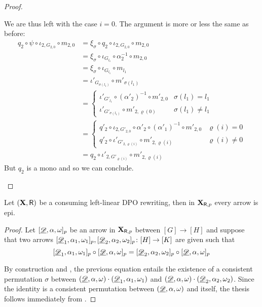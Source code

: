 \begin{proof}
\begin{enumerate}
	 We are thus left with the case $i=0$. The argument is more or less the same as before:
	 \begin{align*}
	 	q_2\circ \psi \circ \iota_{2, G_{2,0}}\circ m_{2,0}&=\xi_\sigma \circ q_2\circ \iota_{2, G_{2,0}}\circ m_{2,0}\\&=\xi_\sigma \circ \iota_{G_{l_1}}\circ \alpha^{-1}_2\circ m_{2,0}\\&=\xi_\sigma \circ \iota_{ G_{l_1}}\circ m_{l_1}\\&=\iota'_{G_{\sigma(l_1)}}\circ m'_{\sigma(l_1)}\\&=\begin{cases}
	 		\iota'_{G'_{l_1}}\circ (\alpha'_2)^{-1} \circ m'_{2, 0}  &\sigma(l_1) = l_1\\
	 		\iota'_{G'_{\sigma(l_1)}}\circ m'_{2,\varrho(0)} & \sigma(l_1)\neq l_1
	 	\end{cases}
	 	\\&=\begin{cases}
	 		q'_2\circ \iota_{2, G'_{2,0}} \circ \alpha'_2\circ  (\alpha'_1)^{-1} \circ m'_{2, 0}& \varrho(i)=0\\
	 		q'_2\circ \iota'_{G'_{2, \varrho(i)}} \circ m'_{2,\varrho(i)} & \varrho(i)\neq 0
	 	\end{cases}\\&=q_2\circ \iota'_{2, G'_{\varrho(i)}}\circ m'_{2, \varrho(i)}
	 \end{align*}
	 But $q_2$ is a mono and so we can conclude.	  \qedhere 
	\end{enumerate}
\end{proof}

\begin{corollary}\label{cor:epi}
	Let $(\textbf {\textup{X}}, \mathsf{R})$ be a consuming left-linear DPO rewriting, then in $\textbf {\textup{X}}_{\mathsf{R}, p}$ every arrow is epi.
\end{corollary}
\begin{proof}
Let $[\underline{\mathscr{D}}, \alpha, \omega]_p$ be an arrow in $\textbf {\textup{X}}_{\mathsf{R}, p}$ between $[G]\to [H]$ and suppose that two arrows $[\underline{\mathscr{D}}_1, \alpha_1, \omega_1]_p, [\underline{\mathscr{D}}_2, \alpha_2, \omega_2]_p\colon [H]\to [K]$  are given such that 
\[[\underline{\mathscr{D}}_1, \alpha_1, \omega_1]_p\circ [\underline{\mathscr{D}}, \alpha, \omega]_p=[\underline{\mathscr{D}}_2, \alpha_2, \omega_2]_p\circ [\underline{\mathscr{D}}, \alpha, \omega]_p\]

By construction and , the previous equation entails the existence of a consistent permutation $\sigma$ between $(\underline{\mathscr{D}}, \alpha, \omega)\cdot (\underline{\mathscr{D}}_1, \alpha_1, \omega_1)$ and $(\underline{\mathscr{D}}, \alpha, \omega)\cdot (\underline{\mathscr{D}}_2, \alpha_2, \omega_2)$. Since the identity is a consistent permutation between $(\underline{\mathscr{D}}, \alpha, \omega)$ and itself, the thesis follows immediately from .
\end{proof}




